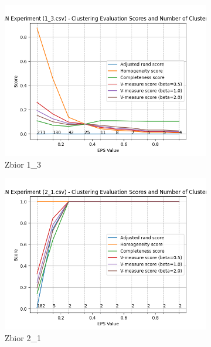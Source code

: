 \documentclass[12pt]{article}
\begin{document}
\begin{figure}[H]
\begin{subfigure}[b]{0.3\textwidth}
        \includegraphics[width=\linewidth]{img/exp_2/dbscan/1_3_scores.png}
        \caption{Zbior 1\_3}
    \end{subfigure}
    \begin{subfigure}[b]{0.3\textwidth}
        \includegraphics[width=\linewidth]{img/exp_2/dbscan/2_1_scores.png}
        \caption{Zbior 2\_1}
    \end{subfigure}
    \hfill
    \begin{subfigure}[b]{0.3\textwidth}

\end{subfigure}
\end{figure}
\end{document}

